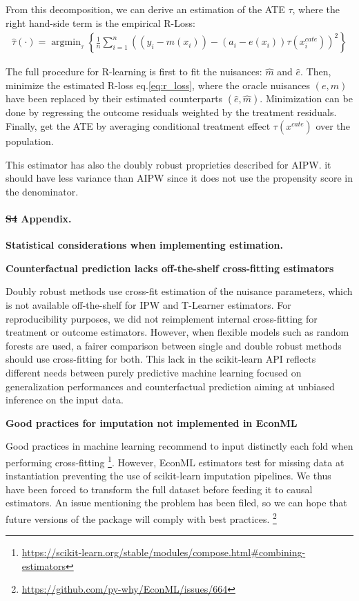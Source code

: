 \documentclass[10pt,letterpaper]{article}
\providecommand{\DIFaddtex}[1]{{\protect\color{blue}\uwave{#1}}} %
\providecommand{\DIFdeltex}[1]{{\protect\color{red}\sout{#1}}}                      %
\providecommand{\DIFaddbegin}{} %
\providecommand{\DIFaddend}{} %
\providecommand{\DIFdelbegin}{} %
\providecommand{\DIFdelend}{} %
\providecommand{\DIFadd}[1]{\texorpdfstring{\DIFaddtex{#1}}{#1}} %
\providecommand{\DIFdel}[1]{\texorpdfstring{\DIFdeltex{#1}}{}} %
\newcommand{\DIFscaledelfig}{0.5}
\newlength{\DIFdelgraphicswidth} %
\newlength{\DIFdelgraphicsheight} %
\newcommand{\DIFaddincludegraphics}[2][]{{\color{blue}\fbox{\DIFOincludegraphics[#1]{#2}}}} %
\newcommand{\DIFdelincludegraphics}[2][]{%
\sbox{\DIFdelgraphicsbox}{\DIFOincludegraphics[#1]{#2}}%
\settoboxwidth{\DIFdelgraphicswidth}{\DIFdelgraphicsbox} %
\settoboxtotalheight{\DIFdelgraphicsheight}{\DIFdelgraphicsbox} %
\scalebox{\DIFscaledelfig}{%
\parbox[b]{\DIFdelgraphicswidth}{\usebox{\DIFdelgraphicsbox}\\[-\baselineskip] \rule{\DIFdelgraphicswidth}{0em}}\llap{\resizebox{\DIFdelgraphicswidth}{\DIFdelgraphicsheight}{%
\setlength{\unitlength}{\DIFdelgraphicswidth}%
\begin{picture}(1,1)%
\thicklines\linethickness{2pt} %
{\color[rgb]{1,0,0}\put(0,0){\framebox(1,1){}}}%
{\color[rgb]{1,0,0}\put(0,0){\line( 1,1){1}}}%
{\color[rgb]{1,0,0}\put(0,1){\line(1,-1){1}}}%
\end{picture}%
}\hspace*{3pt}}} %
} %
\DeclareRobustCommand{\DIFaddbegin}{\DIFOaddbegin \let\includegraphics\DIFaddincludegraphics} %
\DeclareRobustCommand{\DIFaddend}{\DIFOaddend \let\includegraphics\DIFOincludegraphics} %
\DeclareRobustCommand{\DIFdelbegin}{\DIFOdelbegin \let\includegraphics\DIFdelincludegraphics} %
\DeclareRobustCommand{\DIFdelend}{\DIFOaddend \let\includegraphics\DIFOincludegraphics} %
\begin{document}
From this decomposition, we can derive an estimation of the ATE $\tau$, where
the right hand-side term is the empirical R-Loss:
\begin{align}\label{eq:r_loss}
  \hat{\tau}(\cdot)=\operatorname{argmin}_{\tau}\left\{\frac{1}{n} \sum_{i=1}^{n}\left(\left(y_{i}-m\left(x_{i}\right)\right)-\left(a_{i}-e(x_{i})\right) \tau\left(x^{cate}_{i}\right)\right)^{2}\right\}
\end{align}

The full procedure for R-learning is first to fit the nuisances: $\hat m$ and
$\hat e$. Then, minimize the estimated R-loss eq.\ref{eq:r_loss}, where
the oracle nuisances $(e, m)$ have been replaced by their estimated
counterparts $(\hat e, \hat m)$. Minimization can be done by regressing
the outcome residuals weighted by the treatment residuals. Finally, get
the ATE by averaging conditional treatment effect $\tau(x^{cate})$ over
the population.

This estimator has also the doubly robust proprieties described for AIPW. it
should have less variance than AIPW since it does not use the propensity score
in the denominator.
\clearpage


\paragraph*{\DIFdelbegin \DIFdel{S4 }\DIFdelend \DIFaddbegin \DIFadd{S3 }\DIFaddend Appendix.}
\label{apd:statistical_considerations}
{\bf Statistical considerations when implementing
  estimation.}

\textbf{Counterfactual prediction lacks off-the-shelf cross-fitting estimators}

Doubly robust methods use cross-fit estimation of the nuisance parameters,
which is not available off-the-shelf for IPW and T-Learner estimators. For
reproducibility purposes, we did not reimplement internal cross-fitting for
treatment or outcome estimators. However, when flexible models such as
random forests are used, a fairer comparison between single and double
robust methods should use cross-fitting for both. This lack in the
scikit-learn API \cite{pedregosa2011scikit} reflects different needs
between purely predictive machine learning focused on generalization
performances and counterfactual prediction aiming at unbiased inference on
the input data.

\textbf{Good practices for imputation not implemented in EconML}

Good practices in machine learning recommend to input distinctly each fold
when performing cross-fitting
\footnote{\url{https://scikit-learn.org/stable/modules/compose.html\#combining-estimators}}.
However, EconML estimators test for missing data at instantiation
preventing the use of scikit-learn imputation pipelines. We thus have been
forced to transform the full dataset before feeding it to causal estimators.
An issue mentioning the problem has been filed, so we can hope that future
versions of the package will comply with best practices. \footnote{\url{https://github.com/py-why/EconML/issues/664}}
\end{document}
